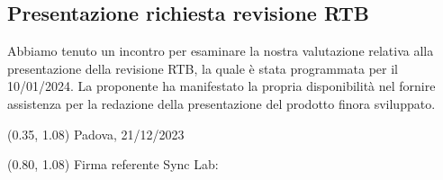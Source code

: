\documentclass{article}
\begin{document}
    \subsection{Presentazione richiesta revisione RTB}
    Abbiamo tenuto un incontro per esaminare la nostra valutazione relativa alla presentazione della revisione RTB, la quale è stata programmata per il 10/01/2024. La proponente ha manifestato la propria disponibilità nel fornire assistenza per la redazione della presentazione del prodotto finora sviluppato.
\begin{textblock*}{\textwidth}(0.35\textwidth, 1.08\textheight)
    Padova, 21/12/2023
\end{textblock*}

\begin{textblock*}{\textwidth}(0.80\textwidth, 1.08\textheight)
        Firma referente Sync Lab:
\end{textblock*}
\end{document}
